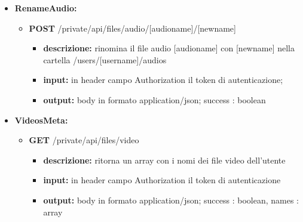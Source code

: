 {{\begin{itemize}
		\item \textbf{RenameAudio:}
			\begin{itemize}
			\item   \textbf{POST} /private/api/files/audio/[audioname]/[newname] 
				\begin{itemize} 
				\item \textbf{descrizione:} rinomina il file audio [audioname] con [newname] nella cartella /users/[username]/audios
				\item \textbf{input:} in header campo Authorization il token di autenticazione;
				\item \textbf{output:} body in formato application/json; success : boolean
				\end{itemize}
			\end{itemize}
						
		\item \textbf{VideosMeta:}
			\begin{itemize}
			\item   \textbf{GET} /private/api/files/video
				\begin{itemize} 
				\item \textbf{descrizione:} ritorna un array con i nomi dei file video dell'utente
				\item \textbf{input:} in header campo Authorization il token di autenticazione
				\item \textbf{output:} body in formato application/json; success : boolean, names : array
				\end{itemize}
			\end{itemize}
			

\end{itemize}}}
